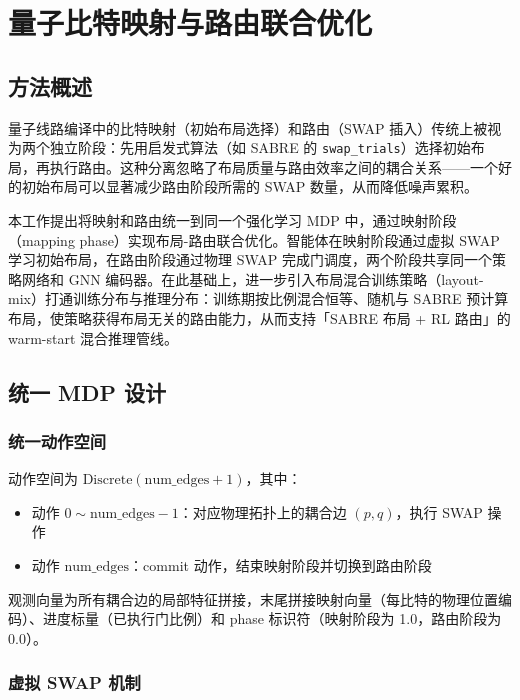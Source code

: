 \newpage
\section{量子比特映射与路由联合优化}

\subsection{方法概述}

量子线路编译中的比特映射（初始布局选择）和路由（SWAP 插入）传统上被视为两个独立阶段：先用启发式算法（如 SABRE 的 \texttt{swap\_trials}）选择初始布局，再执行路由。这种分离忽略了布局质量与路由效率之间的耦合关系——一个好的初始布局可以显著减少路由阶段所需的 SWAP 数量，从而降低噪声累积。

本工作提出将映射和路由统一到同一个强化学习 MDP 中，通过映射阶段（mapping phase）实现布局-路由联合优化。智能体在映射阶段通过虚拟 SWAP 学习初始布局，在路由阶段通过物理 SWAP 完成门调度，两个阶段共享同一个策略网络和 GNN 编码器。在此基础上，进一步引入布局混合训练策略（layout-mix）打通训练分布与推理分布：训练期按比例混合恒等、随机与 SABRE 预计算布局，使策略获得布局无关的路由能力，从而支持「SABRE 布局 + RL 路由」的 warm-start 混合推理管线。

\subsection{统一 MDP 设计}

\subsubsection{统一动作空间}

动作空间为 $\text{Discrete}(\text{num\_edges} + 1)$，其中：
\begin{itemize}
  \item 动作 $0 \sim \text{num\_edges} - 1$：对应物理拓扑上的耦合边 $(p, q)$，执行 SWAP 操作
  \item 动作 $\text{num\_edges}$：commit 动作，结束映射阶段并切换到路由阶段
\end{itemize}

观测向量为所有耦合边的局部特征拼接，末尾拼接映射向量（每比特的物理位置编码）、进度标量（已执行门比例）和 phase 标识符（映射阶段为 1.0，路由阶段为 0.0）。

\subsubsection{虚拟 SWAP 机制}

